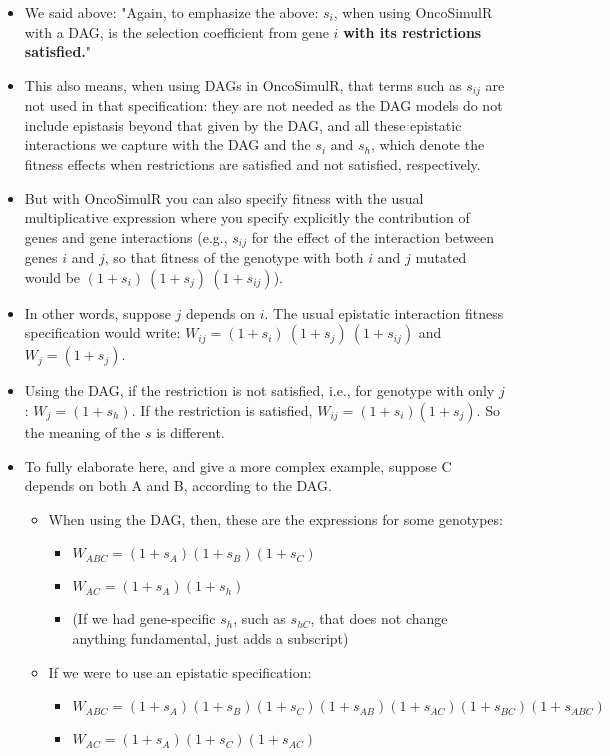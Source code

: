 \documentclass[11pt]{article}
\begin{document}
\begin{itemize}
\item We said above: "Again, to emphasize the above: \(s_i\), when using OncoSimulR with a DAG, is the selection coefficient from gene \(i\) \textbf{with its restrictions satisfied.}"

\item This also means, when using DAGs in OncoSimulR, that terms such as \(s_{ij}\) are not used in that specification: they are not needed as the DAG models do not include epistasis beyond that given by the DAG, and all these epistatic interactions we capture with the DAG and the \(s_i\) and \(s_h\), which denote the fitness effects when restrictions are satisfied and not satisfied, respectively.

\item But with OncoSimulR you can also specify fitness with the usual multiplicative expression where you specify explicitly the contribution of genes and gene interactions (e.g., \(s_{ij}\) for the effect of the interaction between genes \(i\) and \(j\), so that fitness of the genotype with both \(i\) and \(j\) mutated would be \((1 + s_i)\ (1 + s_j)\ (1 + s_{ij})\)).

\item In other words, suppose \(j\) depends on \(i\). The usual epistatic interaction fitness specification would write: \(W_{ij} = (1 + s_i)\ (1 + s_j)\ (1 + s_{ij})\) and \(W_j = (1 + s_j)\).

\item Using the DAG, if the restriction is not satisfied, i.e., for genotype with only \(j\): \(W_j = (1 + s_h)\). If the restriction is satisfied, \(W_{ij} = (1 + s_i) (1 + s_j)\). So the meaning of the \(s\) is different.

\item To fully elaborate here, and give a more complex example, suppose C depends on both A and B, according to the DAG. 

\begin{itemize}
\item When using the DAG, then, these are
the expressions for some genotypes:
\begin{itemize}
\item \(W_{ABC} = (1 + s_A) (1 + s_B) (1 + s_C)\)
\item \(W_{AC}  = (1 + s_A) (1 + s_h)\)
\item (If we had gene-specific \(s_h\), such as \(s_{hC}\), that does not
change anything fundamental, just adds a subscript)
\end{itemize}
\item If we were to use an epistatic specification:
\begin{itemize}
\item \(W_{ABC} = (1 + s_A) (1 + s_B) (1 + s_C) (1 + s_{AB}) (1 + s_{AC}) (1 + s_{BC}) (1 + s_{ABC})\)
\item \(W_{AC}  = (1 + s_A) (1 + s_C) (1 + s_{AC})\)
\end{itemize}
\end{itemize}


\end{itemize}
\end{document}
